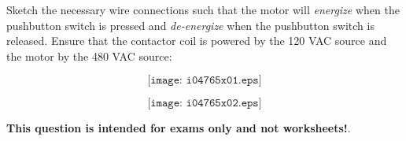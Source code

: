 

Sketch the necessary wire connections such that the motor will {\it energize} when the pushbutton switch is pressed and {\it de-energize} when the pushbutton switch is released.  Ensure that the contactor coil is powered by the 120 VAC source and the motor by the 480 VAC source:

$$\texttt{[image: i04765x01.eps]}$$







$$\texttt{[image: i04765x02.eps]}$$







{\bf This question is intended for exams only and not worksheets!}.



